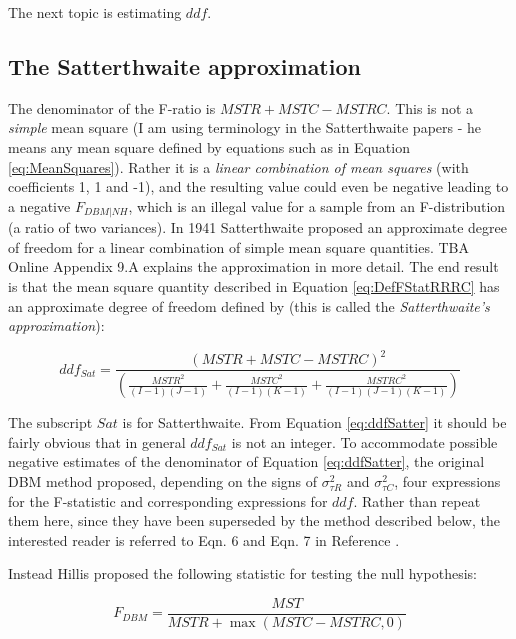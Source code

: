 \documentclass[
]{book}
\begin{document}
The next topic is estimating \(ddf\).

\hypertarget{the-satterthwaite-approximation}{%
\subsection{The Satterthwaite approximation}\label{the-satterthwaite-approximation}}

The denominator of the F-ratio is \(MSTR+MSTC-MSTRC\). This is not a \emph{simple} mean square (I am using terminology in the Satterthwaite papers - he means any mean square defined by equations such as in Equation \eqref{eq:MeanSquares}). Rather it is a \emph{linear combination of mean squares} (with coefficients 1, 1 and -1), and the resulting value could even be negative leading to a negative \(F_{DBM|NH}\), which is an illegal value for a sample from an F-distribution (a ratio of two variances). In 1941 Satterthwaite \citep{RN2359, RN2360} proposed an approximate degree of freedom for a linear combination of simple mean square quantities. TBA Online Appendix 9.A explains the approximation in more detail. The end result is that the mean square quantity described in Equation \eqref{eq:DefFStatRRRC} has an approximate degree of freedom defined by (this is called the \emph{Satterthwaite's approximation}):

\begin{equation}
ddf_{Sat}=\frac{\left ( MSTR + MSTC - MSTRC \right )^2}{\left ( \frac{MSTR^2}{(I-1)(J-1)} + \frac{MSTC^2}{(I-1)(K-1)} + \frac{MSTRC^2}{(I-1)(J-1)(K-1)}  \right )}
\label{eq:ddfSatter}
\end{equation}

The subscript \(Sat\) is for Satterthwaite. From Equation \eqref{eq:ddfSatter} it should be fairly obvious that in general \(ddf_{Sat}\) is not an integer. To accommodate possible negative estimates of the denominator of Equation \eqref{eq:ddfSatter}, the original DBM method \citep{RN204} proposed, depending on the signs of \(\sigma_{\tau R}^2\) and \(\sigma_{\tau C}^2\), four expressions for the F-statistic and corresponding expressions for \(ddf\). Rather than repeat them here, since they have been superseded by the method described below, the interested reader is referred to Eqn. 6 and Eqn. 7 in Reference \citep{RN1866}.

Instead Hillis \citep{RN1865} proposed the following statistic for testing the null hypothesis:

\begin{equation}
F_{DBM} = \frac{MST}{MSTR + \max \left (MSTC - MSTRC, 0  \right )}
\label{eq:FStatHillis}
\end{equation}
\end{document}
